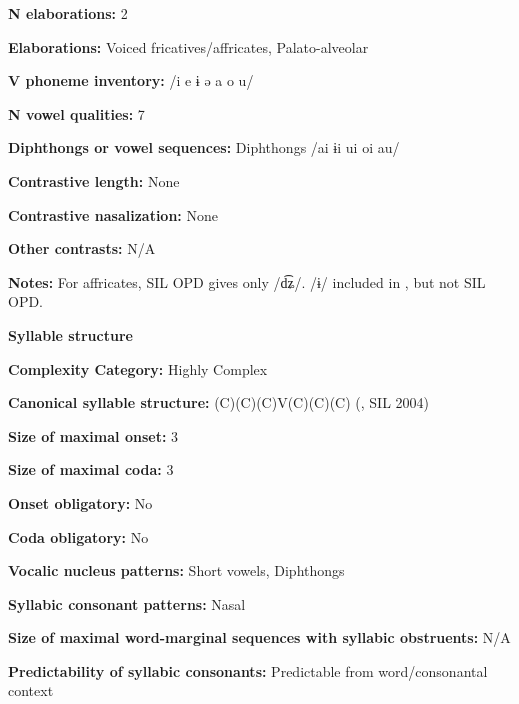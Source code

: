 \textbf{N elaborations:} 2



\textbf{Elaborations:} Voiced fricatives/affricates, Palato-alveolar



\textbf{V phoneme inventory:} /i e ɨ ə a o u/



\textbf{N vowel qualities:} 7



\textbf{Diphthongs or vowel sequences:} Diphthongs /ai ɨi ui oi au/



\textbf{Contrastive length:} None



\textbf{Contrastive nasalization:} None



\textbf{Other contrasts:} N/A



\textbf{Notes:} For affricates, SIL OPD gives only /d͡ʑ/. /ɨ/ included in \citealt{Bruce1984}, but not SIL OPD.



\textbf{Syllable structure}



\textbf{Complexity Category:} Highly Complex



\textbf{Canonical syllable structure:} (C)(C)(C)V(C)(C)(C) (\citealt{Bruce1984}, SIL 2004)



\textbf{Size of maximal onset:} 3



\textbf{Size of maximal coda:} 3



\textbf{Onset obligatory:} No



\textbf{Coda obligatory:} No



\textbf{Vocalic nucleus patterns:} Short vowels, Diphthongs



\textbf{Syllabic consonant patterns:} Nasal



\textbf{Size of maximal word{}-marginal sequences with syllabic obstruents:} N/A



\textbf{Predictability of syllabic consonants:} Predictable from word/consonantal context



